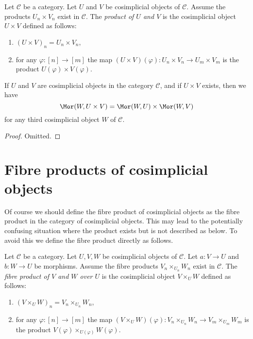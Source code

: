\begin{definition}
\label{definition-product-cosimplicial-objects}
Let $\mathcal{C}$ be a category.
Let $U$ and $V$ be cosimplicial objects of $\mathcal{C}$.
Assume the products $U_n \times V_n$ exist in $\mathcal{C}$.
The {\it product of $U$ and $V$} is the cosimplicial object
$U \times V$ defined as follows:
\begin{enumerate}
\item $(U \times V)_n = U_n \times V_n$,
\item for any $\varphi : [n] \to [m]$ the map
$(U \times V)(\varphi) : U_n \times V_n \to U_m \times V_m$
is the product $U(\varphi) \times V(\varphi)$.
\end{enumerate}
\end{definition}

\begin{lemma}
\label{lemma-product-cosimplicial-objects}
If $U$ and $V$ are cosimplicial objects in the category $\mathcal{C}$,
and if $U \times V$ exists, then we have
$$
\Mor(W, U \times V) =
\Mor(W, U) \times
\Mor(W, V)
$$
for any third cosimplicial object $W$ of $\mathcal{C}$.
\end{lemma}

\begin{proof}
Omitted.
\end{proof}

\section{Fibre products of cosimplicial objects}
\label{section-fibre-products-cosimplicial}

\noindent
Of course we should define the fibre product of cosimplicial objects
as the fibre product in the category of cosimplicial objects. This
may lead to the potentially confusing situation where the product exists
but is not described as below. To avoid this we define the fibre product
directly as follows.

\begin{definition}
\label{definition-fibre-product-cosimplicial-objects}
Let $\mathcal{C}$ be a category.
Let $U, V, W$ be cosimplicial objects of $\mathcal{C}$.
Let $a : V \to U$ and $b : W \to U$ be morphisms.
Assume the fibre products $V_n \times_{U_n} W_n$ exist in $\mathcal{C}$.
The {\it fibre product of $V$ and $W$ over $U$} is the cosimplicial object
$V \times_U W$ defined as follows:
\begin{enumerate}
\item $(V \times_U W)_n = V_n \times_{U_n} W_n$,
\item for any $\varphi : [n] \to [m]$ the map
$(V \times_U W)(\varphi) : V_n \times_{U_n} W_n \to V_m \times_{U_m} W_m$
is the product $V(\varphi) \times_{U(\varphi)} W(\varphi)$.
\end{enumerate}
\end{definition}

